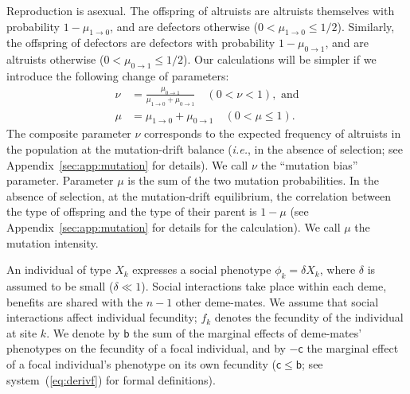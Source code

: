 \documentclass[11pt, letterpaper]{article}
\newcommand{\sysref}[1]{system~(\ref{#1})}
\newcommand{\ie}{\textit{i.e.}}
\newcommand{\bigO}[1]{O\left( #1 \right)}
\newcommand{\appname}[0]{Appendix}
\newcommand{\bb}{\mathsf{b}}
\newcommand{\cc}{\mathsf{c}}
\newcommand{\mutbias}{\nu}
\newcommand{\selstr}{\delta}
\begin{document}
Reproduction is asexual. The offspring of altruists are altruists themselves with probability $1-\mu_{1\to 0}$, and are defectors otherwise ($0<\mu_{1\to 0}\leq 1/2$). Similarly, the offspring of defectors are defectors with probability $1-\mu_{0\to 1}$, and are altruists otherwise ($0<\mu_{0\to 1}\leq 1/2$). Our calculations will be simpler if we introduce the following change of parameters:
\begin{subequations}\label{eq:changemut}
\begin{align}
\mutbias & = \frac{\mu_{0\to 1}}{\mu_{1\to 0} + \mu_{0\to 1}} \quad (0<\mutbias<1), \textrm{ and}\label{eq:nu}\\
\mu &= \mu_{1\to 0} + \mu_{0\to 1} \quad (0 < \mu \leq 1)\label{eq:mu}.
\end{align}
\end{subequations}
The composite parameter $\mutbias$ corresponds to the expected frequency of altruists in the population at the mutation-drift balance (\ie, in the absence of selection; see \appname~\ref{sec:app:mutation} for details). We call $\mutbias$ the ``mutation bias'' parameter. Parameter $\mu$ is the sum of the two mutation probabilities. In the absence of selection, at the mutation-drift equilibrium, the correlation between the type of offspring and the type of their parent is $1-\mu$ (see \appname~\ref{sec:app:mutation} for details for the calculation). We call $\mu$ the mutation intensity.%

An individual of type $X_k$ expresses a social phenotype $\phi_k = \selstr X_k$, where $\selstr$ is assumed to be small ($\selstr \ll 1$). Social interactions take place within each deme, benefits are shared with the $n-1$ other deme-mates. We assume that social interactions affect individual fecundity; $f_k$ denotes the fecundity of the individual at site $k$. We denote by $\bb$ the sum of the marginal effects of deme-mates' phenotypes on the fecundity of a focal individual, and by $-\cc$ the marginal effect of a focal individual's phenotype on its own fecundity ($\cc \leq \bb$; see \sysref{eq:derivf} for formal definitions). %
\end{document}
